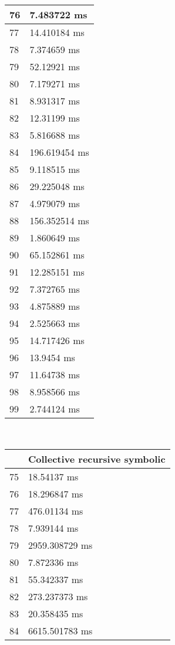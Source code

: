 \begin{multicols}{2}
\begin{tabular}{|l|l|}
		76 & 7.483722 ms \\ \hline
		77 & 14.410184 ms \\ \hline
		78 & 7.374659 ms \\ \hline
		79 & 52.12921 ms \\ \hline
		80 & 7.179271 ms \\ \hline
		81 & 8.931317 ms \\ \hline
		82 & 12.31199 ms \\ \hline
		83 & 5.816688 ms \\ \hline
		84 & 196.619454 ms \\ \hline
		85 & 9.118515 ms \\ \hline
		86 & 29.225048 ms \\ \hline
		87 & 4.979079 ms \\ \hline
		88 & 156.352514 ms \\ \hline
		89 & 1.860649 ms \\ \hline
		90 & 65.152861 ms \\ \hline
		91 & 12.285151 ms \\ \hline
		92 & 7.372765 ms \\ \hline
		93 & 4.875889 ms \\ \hline
		94 & 2.525663 ms \\ \hline
		95 & 14.717426 ms \\ \hline
		96 & 13.9454 ms \\ \hline
		97 & 11.64738 ms \\ \hline
		98 & 8.958566 ms \\ \hline
		99 & 2.744124 ms \\ \hline
	\end{tabular}\\
	\begin{tabular}{|l|l|}
		\hline
		& Collective recursive symbolic \\ \hline
		75 & 18.54137 ms \\ \hline
		76 & 18.296847 ms \\ \hline
		77 & 476.01134 ms \\ \hline
		78 & 7.939144 ms \\ \hline
		79 & 2959.308729 ms \\ \hline
		80 & 7.872336 ms \\ \hline
		81 & 55.342337 ms \\ \hline
		82 & 273.237373 ms \\ \hline
		83 & 20.358435 ms \\ \hline
		84 & 6615.501783 ms \\ \hline

\end{tabular}
\end{multicols}

